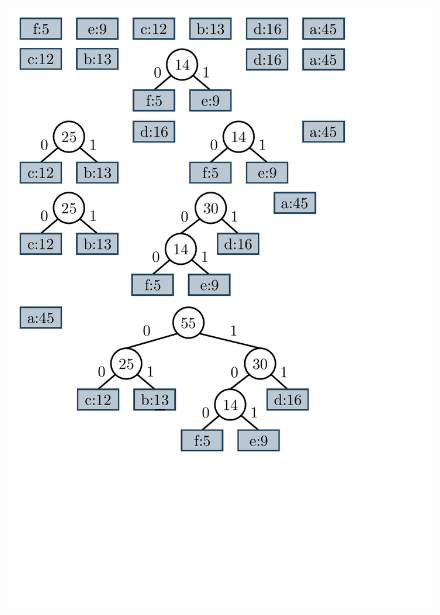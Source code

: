 \begin{figure}
    	\begin{minipage}{1\textwidth}
    		\centering
    		\begin{minipage}{0.45\textwidth}
    			\centering
    			\includegraphics[scale=.4, clip, trim=10 590 120 150]{img/graphs-huffman2.pdf}
    			

\end{minipage}
\end{minipage}
\end{figure}
